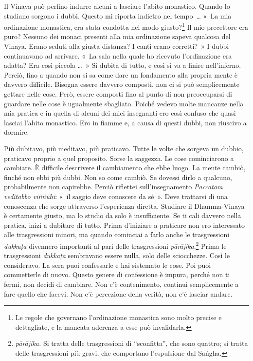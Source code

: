 Il Vinaya può perfino indurre alcuni a lasciare l'abito monastico.
Quando lo studiano sorgono i dubbi. Questo mi riporta indietro nel
tempo~\ldots{} «~La mia ordinazione monastica, era stata condotta nel modo
giusto?\footnote{Le regole che governano l'ordinazione monastica sono
  molto precise e dettagliate, e la mancata aderenza a esse può
  invalidarla.} Il mio precettore era puro? Nessuno dei monaci presenti
alla mia ordinazione sapeva qualcosa del Vinaya. Erano seduti alla
giusta distanza? I canti erano corretti?~» I dubbi continuavano ad
arrivare. «~La sala nella quale ho ricevuto l'ordinazione era adatta?
Era così piccola \ldots{}~» Si dubita di tutto, e così si va a finire
nell'inferno. Perciò, fino a quando non si sa come dare un fondamento
alla propria mente è davvero difficile. Bisogna essere davvero composti,
non ci si può semplicemente gettare nelle cose. Però, essere composti
fino al punto di non preoccuparsi di guardare nelle cose è ugualmente
sbagliato. Poiché vedevo molte mancanze nella mia pratica e in quella di
alcuni dei miei insegnanti ero così confuso che quasi lasciai l'abito
monastico. Ero in fiamme e, a causa di questi dubbi, non riuscivo a
dormire.

Più dubitavo, più meditavo, più praticavo. Tutte le volte che sorgeva un
dubbio, praticavo proprio a quel proposito. Sorse la saggezza. Le cose
cominciarono a cambiare. È difficile descrivere il cambiamento che ebbe
luogo. La mente cambiò, finché non ebbi più dubbi. Non so come cambiò.
Se dovessi dirlo a qualcuno, probabilmente non capirebbe. Perciò
riflettei sull'insegnamento \emph{Paccatam veditabbo viññūhi}: «~il
saggio deve conoscere da sé~». Deve trattarsi di una conoscenza che
sorge attraverso l'esperienza diretta. Studiare il Dhamma-Vinaya è
certamente giusto, ma lo studio da solo è insufficiente. Se ti cali
davvero nella pratica, inizi a dubitare di tutto. Prima d'iniziare a
praticare non ero interessato alle trasgressioni minori, ma quando
cominciai a farlo anche le trasgressioni \emph{dukkaṭa} divennero
importanti al pari delle trasgressioni \emph{pārājika}.\footnote{\emph{pārājika.}
  Si tratta delle trasgressioni di ``sconfitta'', che sono quattro; si
  tratta delle trasgressioni più gravi, che comportano l'espulsione dal
  Saṅgha.} Prima le trasgressioni \emph{dukkaṭa} sembravano essere
nulla, solo delle sciocchezze. Così le consideravo. La sera puoi
confessarle e hai sistemato le cose. Poi puoi commetterle di nuovo.
Questo genere di confessione è impura, perché non ti fermi, non decidi
di cambiare. Non c'è contenimento, continui semplicemente a fare quello
che facevi. Non c'è percezione della verità, non c'è lasciar andare.

